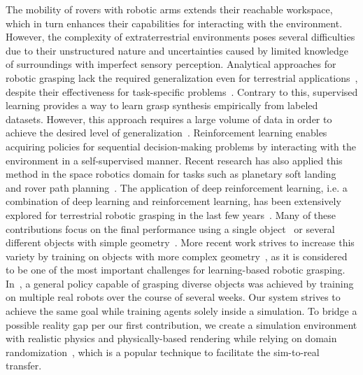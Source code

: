 The mobility of rovers with robotic arms extends their reachable workspace, which in turn enhances their capabilities for interacting with the environment. However, the complexity of extraterrestrial environments poses several difficulties due to their unstructured nature and uncertainties caused by limited knowledge of surroundings with imperfect sensory perception. Analytical approaches for robotic grasping lack the required generalization even for terrestrial applications~\cite{sahbani_overview_2012}, despite their effectiveness for task-specific problems~\cite{schuster_lru_2016,lehner_mobile_2018}. Contrary to this, supervised learning provides a way to learn grasp synthesis empirically from labeled datasets. However, this approach requires a large volume of data in order to achieve the desired level of generalization~\cite{mahler_dex-net_2017}. Reinforcement learning enables acquiring policies for sequential decision-making problems by interacting with the environment in a self-supervised manner. Recent research has also applied this method in the space robotics domain for tasks such as planetary soft landing~\cite{xu_deep_2021} and rover path planning~\cite{jin_value_2021}. The application of deep reinforcement learning, i.e. a combination of deep learning and reinforcement learning, has been extensively explored for terrestrial robotic grasping in the last few years~\cite{kroemer_review_2021}. Many of these contributions focus on the final performance using a single object~\cite{popov_data-efficient_2017} or several different objects with simple geometry~\cite{tobin_domain_2017,zeng_learning_2018}. More recent work strives to increase this variety by training on objects with more complex geometry~\cite{gualtieri_pick_2018,kalashnikov_qt-opt_2018}, as it is considered to be one of the most important challenges for learning-based robotic grasping. In~\cite{kalashnikov_qt-opt_2018}, a general policy capable of grasping diverse objects was achieved by training on multiple real robots over the course of several weeks. Our system strives to achieve the same goal while training agents solely inside a simulation. To bridge a possible reality gap per our first contribution, we create a simulation environment with realistic physics and physically-based rendering while relying on domain randomization~\cite{tobin_domain_2017}, which is a popular technique to facilitate the sim-to-real transfer.

